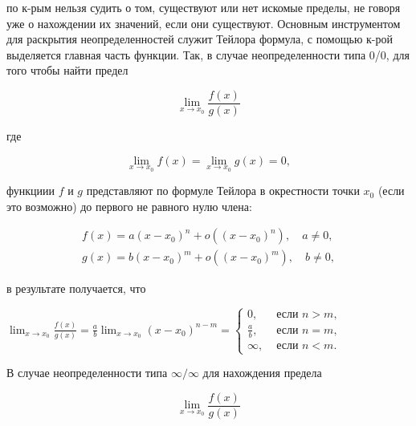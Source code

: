 \documentclass[10pt]{article}
\begin{document}
по к-рым нельзя судить о том, существуют или нет искомые пределы, не говоря уже о нахождении их значений, если они существуют. Основным инструментом для раскрытия неопределенностей служит Тейлора формула, с помощью к-рой выделяется главная часть функции. Так, в случае неопределенности типа 0/0, для того чтобы найти предел



\[

\lim _{x \rightarrow x_{0}} \frac{f(x)}{g(x)}

\]



где



\[

\lim _{x \rightarrow x_{0}} f(x)=\lim _{x \rightarrow x_{0}} g(x)=0,

\]



функциии $f$ и $g$ представляют по формуле Тейлора в окрестности точки $x_{0}$ (если это возможно) до первого не равного нулю члена:



\[

\begin{gathered}

f(x)=a\left(x-x_{0}\right)^{n}+o\left(\left(x-x_{0}\right)^{n}\right), \quad a \neq 0, \\

g(x)=b\left(x-x_{0}\right)^{m}+o\left(\left(x-x_{0}\right)^{m}\right), \quad b \neq 0,

\end{gathered}

\]



в результате получается, что



$\lim _{x \rightarrow x_{0}} \frac{f(x)}{g(x)}=\frac{a}{b} \lim _{x \rightarrow x_{0}}\left(x-x_{0}\right)^{n-m}= \begin{cases}0, & \text { если } n>m, \\ \frac{a}{b}, & \text { если } n=m, \\ \infty, & \text { если } n<m .\end{cases}$



В случае неопределенности типа $\infty / \infty$ для нахождения предела



\[

\lim _{x \rightarrow x_{0}} \frac{f(x)}{g(x)}

\]
\end{document}
